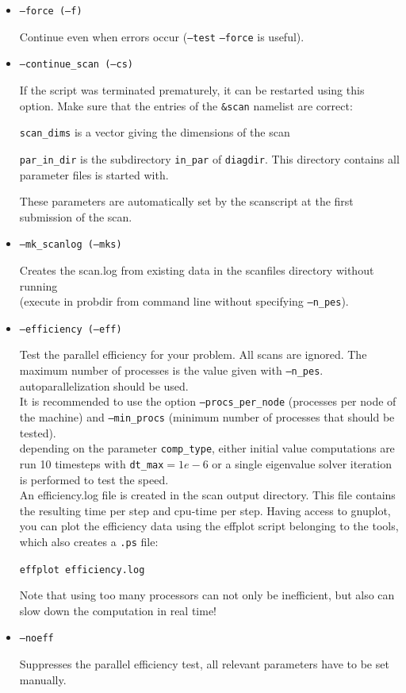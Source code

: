 \documentclass[12pt]{article}
\begin{document}
\begin{itemize}
\item \texttt{--force (--f)}

Continue even when errors occur (\texttt{--test} \texttt{--force} is
useful).

\item \texttt{--continue\_scan (--cs)}

If the script was terminated prematurely, it can be restarted using this option.
Make sure that the entries of the \texttt{\&scan} namelist
are correct:

\texttt{scan\_dims} is a vector giving the dimensions of the scan

\texttt{par\_in\_dir} is the subdirectory \texttt{in\_par} of \texttt{diagdir}. This directory contains all
parameter files \gene is started with.

These parameters are automatically set by the scanscript at the first
submission of the scan.

\item \texttt{--mk\_scanlog (--mks)}

Creates the scan.log from existing data in the scanfiles directory without running
\gene\\ (execute in probdir from command line without specifying
\texttt{--n\_pes}).

\item \texttt{--efficiency (--eff)}

Test the parallel efficiency for your problem. All scans are ignored.
The maximum number of processes is the value given with \texttt{--n\_pes}. \gene
autoparallelization should be used.\\
It is recommended to use the option \texttt{--procs\_per\_node}
(processes per node of the machine) and \texttt{--min\_procs} (minimum
number of processes that should be tested).\\
depending on the parameter \texttt{comp\_type}, either initial value
computations are run 10 timesteps with \texttt{dt\_max}$=1e-6$ or
a single eigenvalue solver iteration is performed to test the speed. \\ 
An efficiency.log file is created in the scan output directory. This
file contains the resulting time per step and cpu-time per step. Having
access to gnuplot, you can
plot the efficiency data using the effplot script belonging to the \gene
tools, which also creates a \texttt{.ps} file:

\texttt{effplot efficiency.log}

Note that using too many processors can not only be inefficient, but also can slow down the
computation in real time!

\item \texttt{--noeff}

Suppresses the parallel efficiency test, all relevant parameters have to
be set manually.
\end{itemize}
\end{document}
